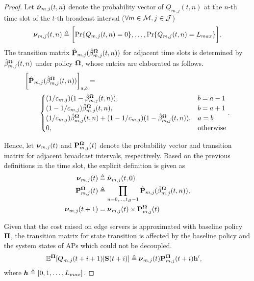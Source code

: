 \begin{proof}
    Let $\hat{\boldsymbol{\nu}}_{m,j}(t,n)$ denote the probability vector of $Q_{m,j}(t,n)$ at the $n$-th time slot of the $t$-th broadcast interval ($\forall m\in\mathcal{M}, j\in\mathcal{J}$)
    \begin{align}
        \vecG{\nu}_{m,j}(t,n) \define \Bracket{
            \Pr\{Q_{m,j}(t,n)=0\}, \dots, \Pr\{Q_{m,j}(t,n)=L_{max}\}
        }.
    \end{align}
    The transition matrix $\hat{\mathbf{P}}_{m,j}(\hat{\beta}^{\boldsymbol{\Omega}}_{m,j}(t,n))$ for adjacent time slots is determined by $\hat{\beta}^{\boldsymbol{\Omega}}_{m,j}(t,n)$ under policy $\boldsymbol{\Omega}$, whose entries are elaborated as follows.
    \begin{align}
        &\bigg[ \hat{\mathbf{P}}_{m,j}(\hat{\beta}^{\boldsymbol{\Omega}}_{m,j}(t,n)) \bigg]_{a,b} =
        \nonumber\\
        &~~~~~~\begin{cases}
            (1/c_{m,j})(1-\hat{\beta}^{\boldsymbol{\Omega}}_{m,j}(t,n)), & b=a-1 \\
            (1-1/c_{m,j})\hat{\beta}^{\boldsymbol{\Omega}}_{m,j}(t,n), & b=a+1 \\
            (1/c_{m,j})\hat{\beta}^{\boldsymbol{\Omega}}_{m,j}(t,n) + (1-1/c_{m,j})(1-\hat{\beta}^{\boldsymbol{\Omega}}_{m,j}(t,n)), & a=b \\
            0, &\text{otherwise}
        \end{cases}.
    \end{align}

    Hence, let $\boldsymbol{\nu}_{m,j}(t)$ and $\mathbf{P}^{\boldsymbol{\Omega}}_{m,j}(t)$ denote the probability vector and transition matrix for adjacent broadcast intervals, respectively.
    Based on the previous definitions in the time slot, the explicit definition is given as
    \begin{align}
        \boldsymbol{\nu}_{m,j}(t) &\triangleq \hat{\boldsymbol{\nu}}_{m,j}(t,0)
        \\
        \mathbf{P}^{\boldsymbol{\Omega}}_{m,j}(t) &\triangleq \prod_{n=0,\dots,t_B-1} \hat{\mathbf{P}}_{m,j}(\hat{\beta}^{\boldsymbol{\Omega}}_{m,j}(t,n)),
        \\
        \boldsymbol{\nu}_{m,j}(t+1) &= \boldsymbol{\nu}_{m,j}(t) \times \mathbf{P}^{\boldsymbol{\Omega}}_{m,j}(t)
    \end{align}

    Given that the cost raised on edge servers is approximated with baseline policy $\mathbf{\Pi}$, the transition matrix for state transition is affected by the baseline policy and the system states of APs which could not be decoupled.
    \begin{align}
        \mathbb{E}^{\mathbf{\Pi}}[ Q_{m,j}({t+i+1}) | \mathbf{S}(t+i)] &\triangleq
            \boldsymbol{\nu}_{m,j}(t) \mathbf{P}^{\mathbf{\Pi}}_{m,j}(t+i) \mathbf{h}',
    \end{align}
    where $\boldsymbol{h} \triangleq [0,1,\dots,L_{max}]$.


\end{proof}
